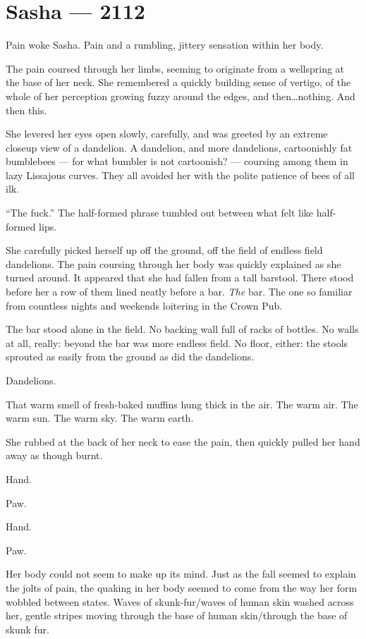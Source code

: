 \hypertarget{sasha-2112}{%
\chapter*{Sasha — 2112}\label{sasha-2112}}

Pain woke Sasha. Pain and a rumbling, jittery sensation within her body.

The pain coursed through her limbs, seeming to originate from a wellspring at the base of her neck. She remembered a quickly building sense of vertigo, of the whole of her perception growing fuzzy around the edges, and then\ldots{}nothing. And then this.

She levered her eyes open slowly, carefully, and was greeted by an extreme closeup view of a dandelion. A dandelion, and more dandelions, cartoonishly fat bumblebees — for what bumbler is not cartoonish? — coursing among them in lazy Lissajous curves. They all avoided her with the polite patience of bees of all ilk.

``The fuck.'' The half-formed phrase tumbled out between what felt like half-formed lips.

She carefully picked herself up off the ground, off the field of endless field dandelions. The pain coursing through her body was quickly explained as she turned around. It appeared that she had fallen from a tall barstool. There stood before her a row of them lined neatly before a bar. \emph{The} bar. The one so familiar from countless nights and weekends loitering in the Crown Pub.

The bar stood alone in the field. No backing wall full of racks of bottles. No walls at all, really: beyond the bar was more endless field. No floor, either: the stools sprouted as easily from the ground as did the dandelions.

Dandelions.

That warm smell of fresh-baked muffins hung thick in the air. The warm air. The warm sun. The warm sky. The warm earth.

She rubbed at the back of her neck to ease the pain, then quickly pulled her hand away as though burnt.

Hand.

Paw.

Hand.

Paw.

Her body could not seem to make up its mind. Just as the fall seemed to explain the jolts of pain, the quaking in her body seemed to come from the way her form wobbled between states. Waves of skunk-fur/waves of human skin washed across her, gentle stripes moving through the base of human skin/through the base of skunk fur.

